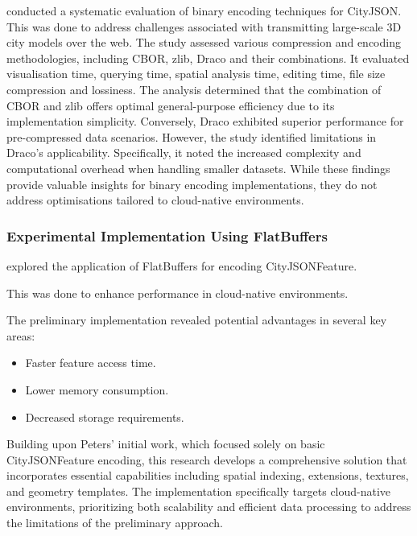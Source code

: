 \citet{jordi_van_liempt_2020} conducted a systematic evaluation of binary encoding techniques for CityJSON.
This was done to address challenges associated with transmitting large-scale 3D city models over the web.
The study assessed various compression and encoding methodologies, including CBOR, zlib, Draco and their combinations.
It evaluated visualisation time, querying time, spatial analysis time, editing time, file size compression and lossiness.
The analysis determined that the combination of CBOR and zlib offers optimal general-purpose efficiency due to its implementation simplicity.
Conversely, Draco exhibited superior performance for pre-compressed data scenarios.
However, the study identified limitations in Draco's applicability.
Specifically, it noted the increased complexity and computational overhead when handling smaller datasets.
While these findings provide valuable insights for binary encoding implementations, they do not address optimisations tailored to cloud-native environments.

\subsubsection{Experimental Implementation Using FlatBuffers}
\label{rw:cityjson_enhancements:performance:flatbuffers}

\citet{ravi_peters_2024_citybuf} explored the application of FlatBuffers \citep{flatbuffers} for encoding CityJSONFeature.

This was done to enhance performance in cloud-native environments.

The preliminary implementation revealed potential advantages in several key areas:

\begin{itemize}
  \item Faster feature access time.
  \item Lower memory consumption.
  \item Decreased storage requirements.
\end{itemize}

Building upon Peters' initial work, which focused solely on basic CityJSONFeature encoding, this research develops a comprehensive solution that incorporates essential capabilities including spatial indexing, extensions, textures, and geometry templates. The implementation specifically targets cloud-native environments, prioritizing both scalability and efficient data processing to address the limitations of the preliminary approach.

